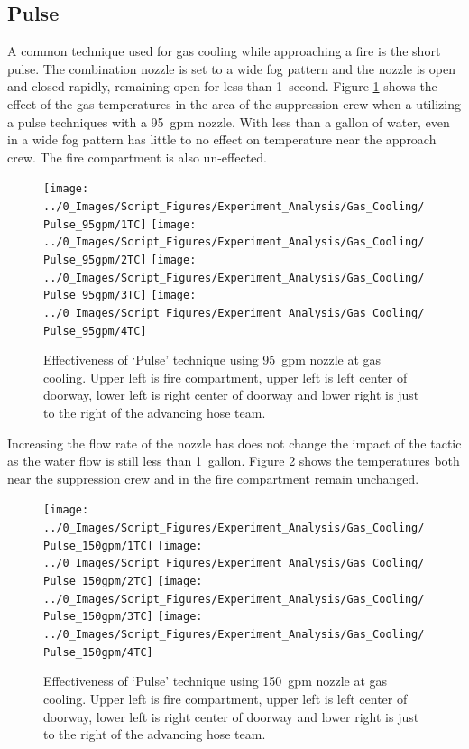 \documentclass[12pt,oneside]{book}
\begin{document}
\subsection{Pulse}
A common technique used for gas cooling while approaching a fire is the short pulse. The combination nozzle is set to a wide fog pattern and the nozzle is open and closed rapidly, remaining open for less than 1~second. Figure \ref{fig:gas_pulse_95} shows the effect of the gas temperatures in the area of the suppression crew when a utilizing a pulse techniques with a 95~gpm nozzle. With less than a gallon of water, even in a wide fog pattern has little to no effect on temperature near the approach crew. The fire compartment is also un-effected. 

\begin{figure}[H]
\centering
\texttt{[image: ../0\_Images/Script\_Figures/Experiment\_Analysis/Gas\_Cooling/Pulse\_95gpm/1TC]}
\texttt{[image: ../0\_Images/Script\_Figures/Experiment\_Analysis/Gas\_Cooling/Pulse\_95gpm/2TC]}
\texttt{[image: ../0\_Images/Script\_Figures/Experiment\_Analysis/Gas\_Cooling/Pulse\_95gpm/3TC]}
\texttt{[image: ../0\_Images/Script\_Figures/Experiment\_Analysis/Gas\_Cooling/Pulse\_95gpm/4TC]}
\caption[Gas Cooling - Pulse 95~gpm]{Effectiveness of `Pulse' technique using 95~gpm nozzle at gas cooling. Upper left is fire compartment, upper left is left center of doorway, lower left is right center of doorway and lower right is just to the right of the advancing hose team.}
\label{fig:gas_pulse_95}
\end{figure}

Increasing the flow rate of the nozzle has does not change the impact of the tactic as the water flow is still less than 1~gallon. Figure \ref{fig:gas_pulse_150} shows the temperatures both near the suppression crew and in the fire compartment remain unchanged. 

\begin{figure}[H]
\centering
\texttt{[image: ../0\_Images/Script\_Figures/Experiment\_Analysis/Gas\_Cooling/Pulse\_150gpm/1TC]}
\texttt{[image: ../0\_Images/Script\_Figures/Experiment\_Analysis/Gas\_Cooling/Pulse\_150gpm/2TC]}
\texttt{[image: ../0\_Images/Script\_Figures/Experiment\_Analysis/Gas\_Cooling/Pulse\_150gpm/3TC]}
\texttt{[image: ../0\_Images/Script\_Figures/Experiment\_Analysis/Gas\_Cooling/Pulse\_150gpm/4TC]}
\caption[Gas Cooling - Pulse 150~gpm]{Effectiveness of `Pulse' technique using 150~gpm nozzle at gas cooling. Upper left is fire compartment, upper left is left center of doorway, lower left is right center of doorway and lower right is just to the right of the advancing hose team.}
\label{fig:gas_pulse_150}
\end{figure}
\end{document}
